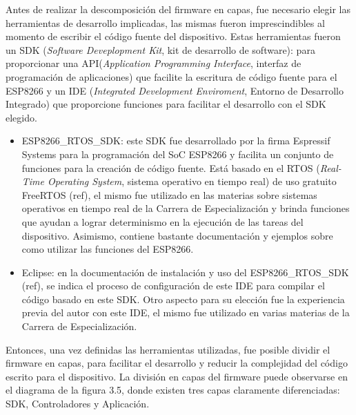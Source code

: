 Antes de realizar la descomposición del firmware en capas, fue necesario elegir las herramientas de desarrollo implicadas, las mismas fueron imprescindibles al momento de escribir el código fuente del dispositivo. Estas herramientas fueron un SDK (\textit{Software Deveplopment Kit}, kit de desarrollo de software): para proporcionar una API(\textit{Application Programming Interface}, interfaz de programación de aplicaciones) que facilite la escritura de código fuente para el ESP8266 y un IDE (\textit{Integrated Development Enviroment}, Entorno de Desarrollo Integrado) que proporcione funciones para facilitar el desarrollo con el SDK elegido.

\begin{itemize}
	\item ESP8266\_RTOS\_SDK: este SDK fue desarrollado por la firma Espressif Systems para la programación del SoC ESP8266 y facilita un conjunto de funciones para la creación de código fuente. Está basado en el RTOS (\textit{Real-Time Operating System}, sistema operativo en tiempo real) de uso gratuito FreeRTOS (ref), el mismo fue utilizado en las materias sobre sistemas operativos en tiempo real de la Carrera de Especialización y brinda funciones que ayudan a lograr determinismo en la ejecución de las tareas del dispositivo. Asimismo, contiene bastante documentación y ejemplos sobre como utilizar las funciones del ESP8266.
	\item Eclipse: en la documentación de instalación y uso del ESP8266\_RTOS\_SDK (ref), se indica el proceso de configuración de este IDE para compilar el código basado en este SDK. Otro aspecto para su elección fue la experiencia previa del autor con este IDE, el mismo fue utilizado en varias materias de la Carrera de Especialización.
\end{itemize}

Entonces, una vez definidas las herramientas utilizadas, fue posible dividir el firmware en capas, para facilitar el desarrollo y reducir la complejidad del código escrito para el dispositivo. La división en capas del firmware puede observarse en el diagrama de la figura 3.5, donde existen tres capas claramente diferenciadas: SDK, Controladores y Aplicación.

